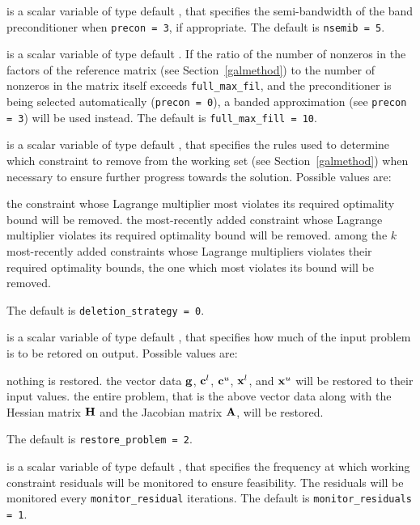 \begin{description}
 is a scalar variable of type default \integer, that specifies
the semi-bandwidth of the band preconditioner when {\tt precon = 3},
if appropriate.
The default is {\tt nsemib = 5}.

 is a scalar variable of type default \integer.
If the ratio of the number of nonzeros in the factors
of the reference matrix (see Section~\ref{galmethod}) to the number of
nonzeros in the matrix itself exceeds {\tt full\_max\_fil},
and the preconditioner is being selected
automatically ({\tt precon = 0}), a banded approximation (see {\tt precon = 3})
will be used instead.
The default is {\tt full\_max\_fill = 10}.

 is a scalar variable of type default \integer, that
specifies the rules used to determine which constraint to remove
from the working set (see Section~\ref{galmethod}) when necessary to ensure
further progress towards the solution. Possible values are:
\begin{description}
 the constraint whose Lagrange multiplier most violates its
required optimality bound will be removed.
the most-recently added constraint whose Lagrange multiplier violates its
required optimality bound will be removed.
 among the $k$ most-recently added constraints whose
Lagrange multipliers violates their required optimality bounds,
the one which most violates its bound will be removed.
\end{description}
The default is {\tt deletion\_strategy = 0}.

 is a scalar variable of type default \integer, that
specifies how much of the input problem is to be retored on output.
Possible values are:
\begin{description}
 nothing is restored.
 the vector data ${\mathbf{g}}$,
   ${\mathbf{c}}^{l}$, ${\mathbf{c}}^{u}$, ${\mathbf{x}}^{l}$, and ${\mathbf{x}}^{u}$
   will be restored to their input values.
 the entire problem, that is the above vector data along with
the Hessian matrix ${\mathbf{H}}$ and the Jacobian matrix ${\mathbf{A}}$, will be restored.
\end{description}
The default is {\tt restore\_problem = 2}.

 is a scalar variable of type default \integer, that
specifies the frequency at which working constraint residuals will be monitored
to ensure feasibility. The  residuals will be monitored every
{\tt monitor\_residu\-al} iterations.
The default is {\tt monitor\_residuals = 1}.


\end{description}
